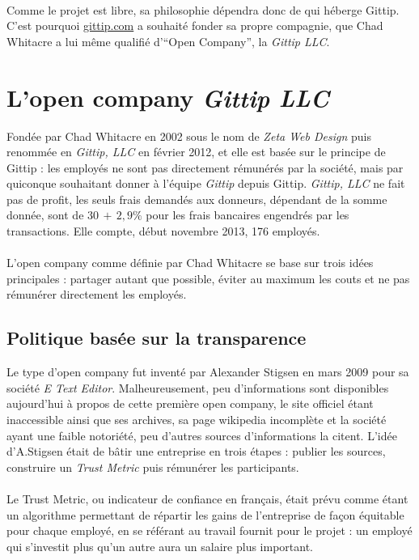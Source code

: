 \paragraph{}
Comme le projet est libre, sa philosophie dépendra donc de qui héberge Gittip.
C'est pourquoi \url{gittip.com} a souhaité fonder sa propre compagnie, que Chad
Whitacre a lui même qualifié d'``Open Company'', la \emph{Gittip LLC}.


    \section{L'open company \emph{Gittip LLC}}

Fondée par Chad Whitacre en 2002 sous le nom de \emph{Zeta Web Design} puis
renommée en \emph{Gittip, LLC} en février 2012, et elle est basée sur le
principe de Gittip : les employés ne sont pas directement rémunérés par la
société, mais par quiconque souhaitant donner à l'équipe \emph{Gittip} depuis
Gittip. \emph{Gittip, LLC} ne fait pas de profit, les seuls frais demandés aux
donneurs, dépendant de la somme donnée, sont de $30$\textcent $\, + \, 2,9\%{}$
pour les frais bancaires engendrés par les transactions. Elle compte,
début novembre 2013, 176 employés.

\paragraph{}
L'open company comme définie par Chad Whitacre se base sur trois idées
principales : partager autant que possible, éviter au maximum les couts et ne
pas rémunérer directement les employés.

    \subsection{Politique basée sur la transparence}

Le type d'open company fut inventé par Alexander Stigsen en mars 2009 pour sa
société \emph{E Text Editor}. Malheureusement, peu d'informations sont
disponibles aujourd'hui à propos de cette première open company, le site
officiel étant inaccessible ainsi que ses archives, sa page wikipedia
incomplète et la société ayant une faible notoriété, peu d'autres sources
d'informations la citent. L'idée d'A.Stigsen était de bâtir une entreprise en
trois étapes : publier les sources, construire un \emph{Trust Metric} puis
rémunérer les participants.

\paragraph{}
Le Trust Metric, ou indicateur de confiance en français, était prévu comme
étant un algorithme permettant de répartir les gains de l'entreprise
de façon équitable pour chaque employé, en se référant au travail fournit pour
le projet : un employé qui s'investit plus qu'un autre aura un salaire plus
important.


